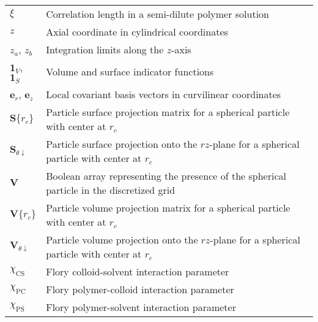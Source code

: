 \documentclass[10pt, a4paper, twocolumn]{article}
\begin{document}
\begin{tabularx}{\linewidth}{l X}
    $\xi$ & Correlation length in a semi-dilute polymer solution \\
    $z$ & Axial coordinate in cylindrical coordinates \\
    $z_a$, $z_b$ & Integration limits along the $z$-axis \\
    $\bm{1}_{V}$, $\bm{1}_{S}$ & Volume and surface indicator functions \\
    $\bm{e}_r$, $\bm{e}_z$ & Local covariant basis vectors in curvilinear coordinates \\
    $\bm{S}\{r_{c}\}$ & Particle surface projection matrix for a spherical particle with center at $r_{c}$ \\
    $\bm{S}_{\theta\downarrow}$ & Particle surface projection onto the $rz$-plane for a spherical particle with center at $r_{c}$ \\
    $\bm{V}$ & Boolean array representing the presence of the spherical particle in the discretized grid \\
    $\bm{V}\{r_{c}\}$ & Particle volume projection matrix for a spherical particle with center at $r_{c}$ \\
    $\bm{V}_{\theta\downarrow}$ & Particle volume projection onto the $rz$-plane for a spherical particle with center at $r_{c}$ \\
    $\chi_{\text{CS}}$ & Flory colloid-solvent interaction parameter \\
    $\chi_{\text{PC}}$ & Flory polymer-colloid interaction parameter \\
    $\chi_{\textrm{PS}}$ & Flory polymer-solvent interaction parameter \\
\end{tabularx}


\printbibliography
\end{document}
